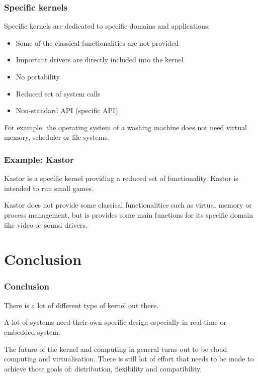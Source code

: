 %
%

\begin{frame}
  \frametitle{Specific kernels}

  Specific kernels are dedicated to specific domains and applications.

  \begin{itemize}
  \item
    Some of the classical functionalities are not provided
  \item
    Important drivers are directly included into the kernel
  \item
    No portability
  \item
    Reduced set of system calls
  \item
    Non-standard API (specific API)
  \end{itemize}

  \-

  For example, the operating system of a washing machine does not need virtual memory, scheduler or file systems.

\end{frame}

%
%

\begin{frame}
  \frametitle{Example: Kastor}

  Kastor is a specific kernel providing a reduced set of functionality. Kastor is intended to run small games.

  \begin{center}
  \end{center}

  Kastor does not provide some classical functionalities such as virtual memory or process management, but is provides some main functions for its specific domain like video or sound drivers.

\end{frame}

\section{Conclusion}
\begin{frame}
  \frametitle{Conclusion}
        There is a lot of different type of kernel out there.

        \-

        A lot of systems need their own specific design especially in real-time or embedded system.

        \-

        The future of the kernel and computing in general turns out to be cloud computing and virtualisation.
        There is still lot of effort that needs to be made to achieve those goals of: distribution, flexibility and compatibility.
\end{frame}



